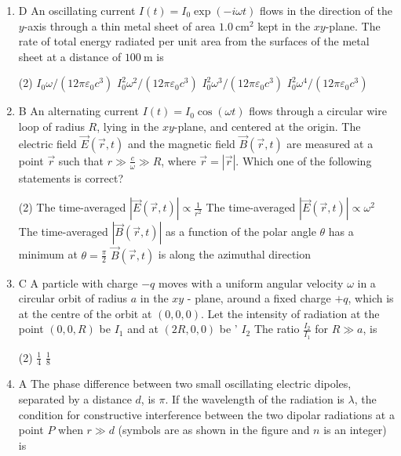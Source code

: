 \begin{enumerate}
\item D An oscillating current $I(t)=I_{0} \exp (-i \omega t)$ flows in the direction of the $y$-axis through a thin metal sheet of area $1.0 \mathrm{~cm}^{2}$ kept in the $x y$-plane. The rate of total energy radiated per unit area from the surfaces of the metal sheet at a distance of $100 \mathrm{~m}$ is
{}
 \begin{tasks}(2)
	\task[\textbf{a.}]$I_{0} \omega /\left(12 \pi \varepsilon_{0} c^{3}\right)$
	\task[\textbf{b.}]$I_{0}^{2} \omega^{2} /\left(12 \pi \varepsilon_{0} c^{3}\right)$
	\task[\textbf{c.}]$I_{0}^{2} \omega^{3} /\left(12 \pi \varepsilon_{0} c^{3}\right)$
	\task[\textbf{d.}] $I_{0}^{2} \omega^{4} /\left(12 \pi \varepsilon_{0} c^{3}\right)$
\end{tasks}
\item B An alternating current $I(t)=I_{0} \cos (\omega t)$ flows through a circular wire loop of radius $R$, lying in the $x y$-plane, and centered at the origin. The electric field $\vec{E}(\vec{r}, t)$ and the magnetic field $\vec{B}(\vec{r}, t)$ are measured at a point $\vec{r}$ such that $r \gg \frac{c}{\omega} \gg R$, where $\vec{r}=|\vec{r}|$.
Which one of the following statements is correct?
{}
 \begin{tasks}(2)
	\task[\textbf{a.}] The time-averaged $|\vec{E}(\vec{r}, t)| \propto \frac{1}{r^{2}}$
	\task[\textbf{b.}]The time-averaged $|\vec{E}(\vec{r}, t)| \propto \omega^{2}$
	\task[\textbf{c.}]The time-averaged $|\vec{B}(\vec{r}, t)|$ as a function of the polar angle $\theta$ has a minimum at $\theta=\frac{\pi}{2}$
	\task[\textbf{d.}] $\vec{B}(\vec{r}, t)$ is along the azimuthal direction
\end{tasks}
\item  C A particle with charge $-q$ moves with a uniform angular velocity $\omega$ in a circular orbit of radius $a$ in the $x y$ - plane, around a fixed charge $+q$, which is at the centre of the orbit at $(0,0,0)$. Let the intensity of radiation at the point $(0,0, R)$ be $I_{1}$ and at $(2 R, 0,0)$ be ' $I_{2}$ The ratio $\frac{I_{2}}{I_{1}}$ for $R \gg a$, is
{}
 \begin{tasks}(2)
	\task[\textbf{b.}]$\frac{1}{4}$
	\task[\textbf{c.}]$\frac{1}{8}$
\end{tasks}
\item A The phase difference between two small oscillating electric dipoles, separated by a distance $d$, is $\pi$. If the wavelength of the radiation is $\lambda$, the condition for constructive interference between the two dipolar radiations at a point $P$ when $r \gg d$ (symbols are as shown in the figure and $n$ is an integer) is

\end{enumerate}
